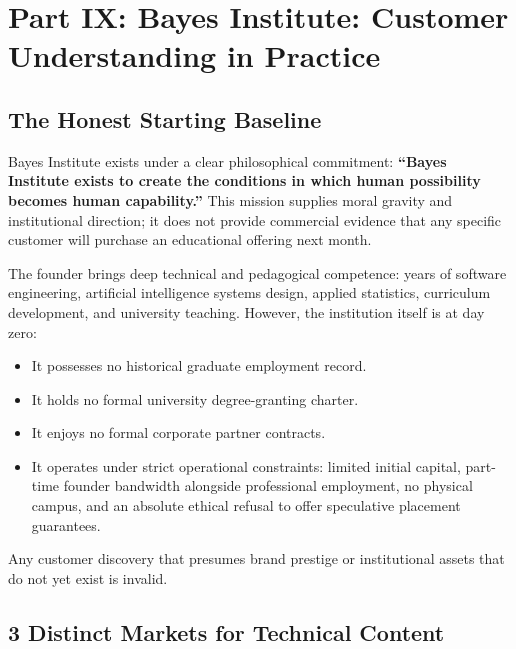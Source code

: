 \section{Part IX: Bayes Institute: Customer Understanding in Practice}

\subsection{The Honest Starting Baseline}

Bayes Institute exists under a clear philosophical commitment: \textbf{``Bayes Institute exists to create the conditions in which human possibility becomes human capability.''} This mission supplies moral gravity and institutional direction; it does not provide commercial evidence that any specific customer will purchase an educational offering next month.

The founder brings deep technical and pedagogical competence: years of software engineering, artificial intelligence systems design, applied statistics, curriculum development, and university teaching. However, the institution itself is at day zero:
\begin{itemize}[leftmargin=1.2em,itemsep=0.2ex]
  \item It possesses no historical graduate employment record.
  \item It holds no formal university degree-granting charter.
  \item It enjoys no formal corporate partner contracts.
  \item It operates under strict operational constraints: limited initial capital, part-time founder bandwidth alongside professional employment, no physical campus, and an absolute ethical refusal to offer speculative placement guarantees.
\end{itemize}
Any customer discovery that presumes brand prestige or institutional assets that do not yet exist is invalid.

\subsection{3 Distinct Markets for Technical Content}

